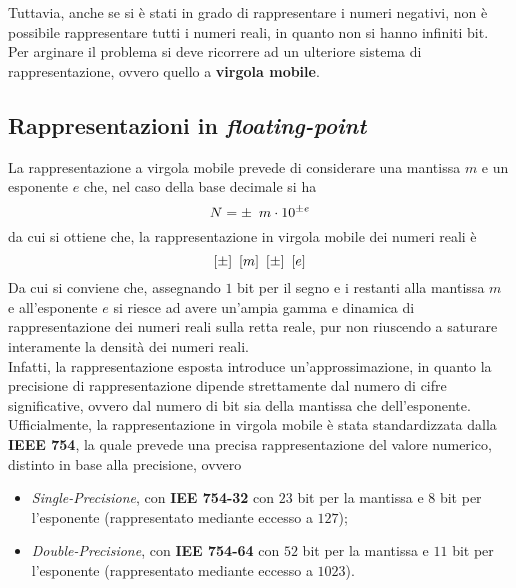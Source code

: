 \documentclass[a4paper]{extarticle}
\begin{document}
\vspace{1em}
\noindent
Tuttavia, anche se si è stati in grado di rappresentare i numeri negativi, non è possibile rappresentare tutti i numeri reali, in quanto non si hanno infiniti bit. Per arginare il problema si deve ricorrere ad un ulteriore sistema di rappresentazione, ovvero quello a \textbf{virgola mobile}.

\subsection{Rappresentazioni in \textit{floating-point}}
La rappresentazione a virgola mobile prevede di considerare una mantissa \(m\) e un esponente \(e\) che, nel caso della base decimale si ha
\[N = \pm \hspace{0.5em} m \cdot 10^{\pm e}\]
da cui si ottiene che, la rappresentazione in virgola mobile dei numeri reali è
\[[\pm] \hspace{0.5em} [m] \hspace{0.5em} [\pm] \hspace{0.5em} [e]\]
Da cui si conviene che, assegnando \(1\) bit per il segno e i restanti alla mantissa \(m\) e all'esponente \(e\) si riesce ad avere un'ampia gamma e dinamica di rappresentazione dei numeri reali sulla retta reale, pur non riuscendo a saturare interamente la densità dei numeri reali.\\
Infatti, la rappresentazione esposta introduce un'approssimazione, in quanto la precisione di rappresentazione dipende strettamente dal numero di cifre significative, ovvero dal numero di bit sia della mantissa che dell'esponente.\\
Ufficialmente, la rappresentazione in virgola mobile è stata standardizzata dalla \textbf{IEEE 754}, la quale prevede una precisa rappresentazione del valore numerico, distinto in base alla precisione, ovvero
\begin{itemize}
    \item \textit{Single-Precisione}, con \textbf{IEE 754-32} con \(23\) bit per la mantissa e \(8\) bit per l'esponente (rappresentato mediante eccesso a \(127\));
    \item \textit{Double-Precisione}, con \textbf{IEE 754-64} con \(52\) bit per la mantissa e \(11\) bit per l'esponente (rappresentato mediante eccesso a \(1023\)).
\end{itemize}

\vspace{1em}
\end{document}
